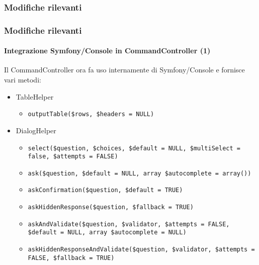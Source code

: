 \begin{frame}[fragile]
	\frametitle{Modifiche rilevanti}\frametitle{Modifiche rilevanti}
	\framesubtitle{Integrazione Symfony/Console in CommandController (1)}

	\lstset{basicstyle=\tiny\ttfamily}

	Il CommandController ora fa uso internamente di Symfony/Console e fornisce vari metodi:

	\begin{itemize}

		\item \smaller TableHelper
			\begin{itemize}
				\item\smaller\texttt{outputTable(\$rows, \$headers = NULL)}
			\end{itemize}

		\item DialogHelper
			\begin{itemize}
				\item\smaller\texttt{select(\$question, \$choices, \$default = NULL, \$multiSelect = false, \$attempts = FALSE)}
				\item\texttt{ask(\$question, \$default = NULL, array \$autocomplete = array())}
				\item\texttt{askConfirmation(\$question, \$default = TRUE)}
				\item\texttt{askHiddenResponse(\$question, \$fallback = TRUE)}
				\item\texttt{askAndValidate(\$question, \$validator, \$attempts = FALSE, \$default = NULL, array \$autocomplete = NULL)}
				\item\texttt{askHiddenResponseAndValidate(\$question, \$validator, \$attempts = FALSE, \$fallback = TRUE)}
			\end{itemize}

	\end{itemize}

\end{frame}


